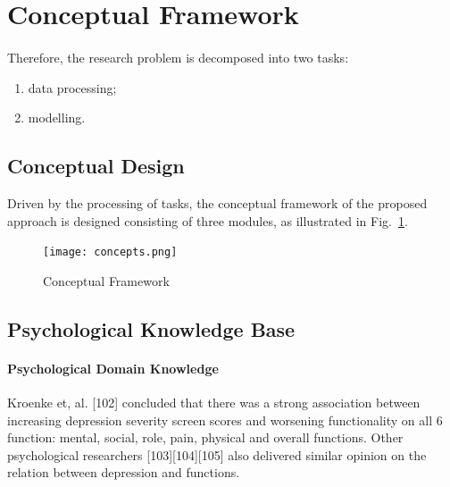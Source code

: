 \documentclass[runningheads]{llncs}
\begin{document}
\paragraph{}
%
%
%
\pagebreak
\section{Conceptual Framework}
%
\paragraph{}

Therefore, the research problem is decomposed into two tasks: 
\begin{enumerate}
  \item data processing;
  \item modelling.
\end{enumerate}
%
\subsection{Conceptual Design}
Driven by the processing of tasks, the conceptual framework of the proposed approach is designed consisting of three modules, as illustrated in Fig.~\ref{fig1}.
\begin{figure}[h]
\texttt{[image: concepts.png]}
\caption{Conceptual Framework} \label{fig1}
\end{figure}
%
%
\subsection{Psychological Knowledge Base}
%
\paragraph{Psychological Domain Knowledge}
Kroenke et, al. [102] concluded that there was a strong association between increasing depression severity screen scores and worsening functionality on all 6 function: mental, social, role, pain, physical and overall functions. Other psychological researchers [103][104][105] also delivered similar opinion on the relation between depression and functions. 
%
\end{document}
